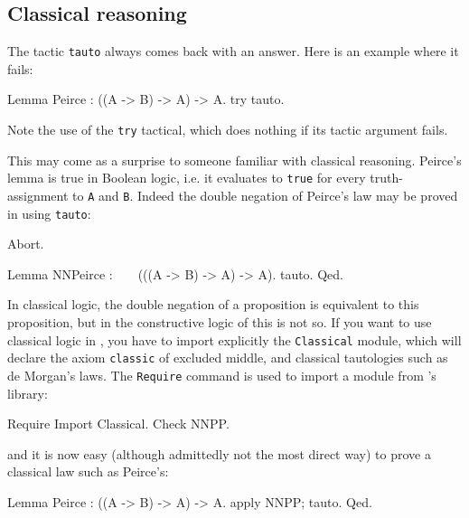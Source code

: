 \documentclass[11pt,a4paper]{book}
\begin{document}
\subsection{Classical reasoning}

The tactic \verb:tauto: always comes back with an answer. Here is an example where it
fails:
\begin{coq_example}
Lemma Peirce : ((A -> B) -> A) -> A.
try tauto.
\end{coq_example}

Note the use of the \verb:try: tactical, which does nothing if its tactic
argument fails.

This may come as a surprise to someone familiar with classical reasoning.
Peirce's lemma is true in Boolean logic, i.e. it evaluates to \verb:true: for
every truth-assignment to \verb:A: and \verb:B:. Indeed the double negation
of Peirce's law may be proved in \Coq{} using \verb:tauto::
\begin{coq_eval}
Abort.
\end{coq_eval}
\begin{coq_example}
Lemma NNPeirce : ~ ~ (((A -> B) -> A) -> A).
tauto.
Qed.
\end{coq_example}

In classical logic, the double negation of a proposition is equivalent to this
proposition, but in the constructive logic of \Coq{} this is not so. If you
want to use classical logic in \Coq, you have to import explicitly the
\verb:Classical: module, which will declare the axiom \verb:classic:
of excluded middle, and classical tautologies such as de Morgan's laws.
The \verb:Require: command is used to import a module from \Coq's library:
\begin{coq_example}
Require Import Classical.
Check NNPP.
\end{coq_example}

and it is now easy (although admittedly not the most direct way) to prove
a classical law such as Peirce's:
\begin{coq_example}
Lemma Peirce : ((A -> B) -> A) -> A.
apply NNPP; tauto.
Qed.
\end{coq_example}
\end{document}
